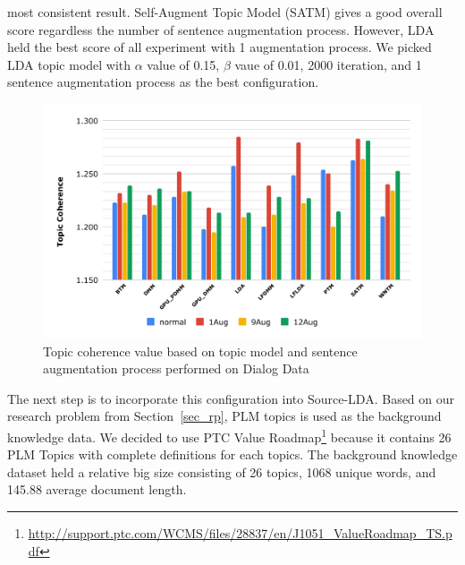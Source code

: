 \documentclass[10pt, conference, compsocconf]{IEEEtran}
\begin{document}
most consistent result. Self-Augment Topic Model (SATM) gives a good overall score regardless the number of sentence augmentation process. However, LDA held the best score of all experiment with 1 augmentation process. We picked LDA topic model with $\alpha$ value of 0.15, $\beta$ vaue of 0.01, 2000 iteration, and 1 sentence augmentation process as the best configuration.

\begin{figure}[t]
	\includegraphics[scale=0.425]{new-topic1.pdf}
	\caption{Topic coherence value based on topic model and sentence augmentation process performed on Dialog Data}
\label{fig_tme}
\end{figure}

The next step is to incorporate this configuration into  Source-LDA. Based on our research problem from Section~\ref{sec_rp}, PLM topics is used as the background knowledge data. We decided to use PTC Value Roadmap\footnote{\url{http://support.ptc.com/WCMS/files/28837/en/J1051_ValueRoadmap_TS.pdf}} because it contains 26 PLM Topics with complete definitions for each topics. The background knowledge dataset held a relative big size consisting of 26 topics, 1068 unique words, and 145.88 average document length. 
\end{document}
